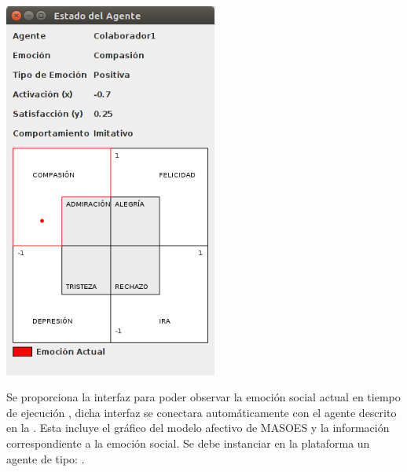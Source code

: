 \begin{ilustracion}[fuente=\yo, etiqueta=interfaz-estado-agente, titulo={Interfaz Para Observar el Estado Emocional Dado un Agente}]
\includegraphics[width=7cm]{ilustraciones/interfaces/estado-agente.png}
\end{ilustracion}


Se proporciona la interfaz  para poder observar la emoción social actual
en tiempo de ejecución , dicha interfaz se conectara automáticamente con el agente descrito en la .
Esta incluye el gráfico del modelo afectivo de MASOES y la información correspondiente a
la emoción social. Se debe instanciar en la plataforma un agente de tipo: .

